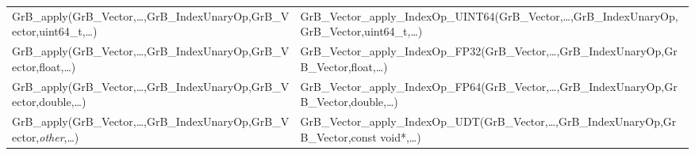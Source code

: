 \begin{landscape}
\begin{table}[htb]
{\begin{tabular}{l|l}
{\sf GrB\_apply(GrB\_Vector,\ldots,GrB\_IndexUnaryOp,GrB\_Vector,uint64\_t,\ldots)}	& {\sf GrB\_Vector\_apply\_IndexOp\_UINT64(GrB\_Vector,\ldots,GrB\_IndexUnaryOp,GrB\_Vector,uint64\_t,\ldots)} \\
{\sf GrB\_apply(GrB\_Vector,\ldots,GrB\_IndexUnaryOp,GrB\_Vector,float,\ldots)}		& {\sf GrB\_Vector\_apply\_IndexOp\_FP32(GrB\_Vector,\ldots,GrB\_IndexUnaryOp,GrB\_Vector,float,\ldots)} \\
{\sf GrB\_apply(GrB\_Vector,\ldots,GrB\_IndexUnaryOp,GrB\_Vector,double,\ldots)}	    & {\sf GrB\_Vector\_apply\_IndexOp\_FP64(GrB\_Vector,\ldots,GrB\_IndexUnaryOp,GrB\_Vector,double,\ldots)} \\
{\sf GrB\_apply(GrB\_Vector,\ldots,GrB\_IndexUnaryOp,GrB\_Vector,\emph{other},\ldots)}	& {\sf GrB\_Vector\_apply\_IndexOp\_UDT(GrB\_Vector,\ldots,GrB\_IndexUnaryOp,GrB\_Vector,const void*,\ldots)} \\
\hline


\end{tabular}}
\end{table}
\end{landscape}
